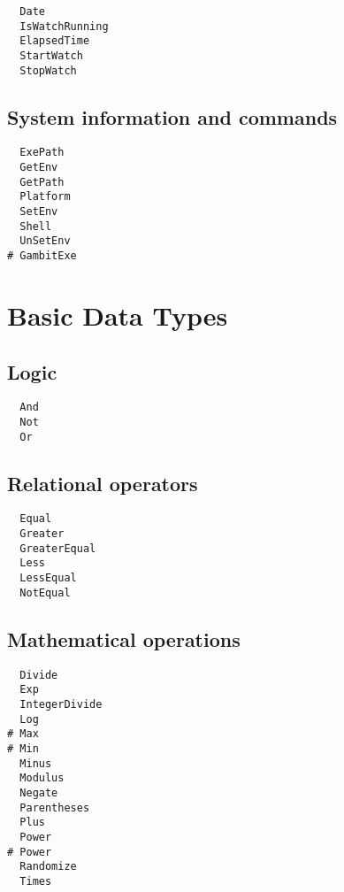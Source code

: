 \begin{multicols}{3}
\begin{verbatim}
  Date 
  IsWatchRunning 
  ElapsedTime 
  StartWatch 
  StopWatch 
\end{verbatim}
\end{multicols}

\subsection{System information and commands}

\begin{multicols}{3}
\begin{verbatim}
  ExePath 
  GetEnv 
  GetPath 
  Platform 
  SetEnv 
  Shell 
  UnSetEnv 
# GambitExe 
\end{verbatim}
\end{multicols}

\section{Basic Data Types}

\subsection{Logic}

\begin{multicols}{3}
\begin{verbatim}
  And 
  Not 
  Or 
\end{verbatim}
\end{multicols}

\subsection{Relational operators}

\begin{multicols}{3}
\begin{verbatim}
  Equal 
  Greater 
  GreaterEqual 
  Less 
  LessEqual 
  NotEqual 
\end{verbatim}
\end{multicols}

\subsection{Mathematical operations}

\begin{multicols}{3}
\begin{verbatim}
  Divide 
  Exp 
  IntegerDivide 
  Log 
# Max
# Min
  Minus 
  Modulus 
  Negate 
  Parentheses 
  Plus 
  Power 
# Power 
  Randomize 
  Times 
\end{verbatim}
\end{multicols}


